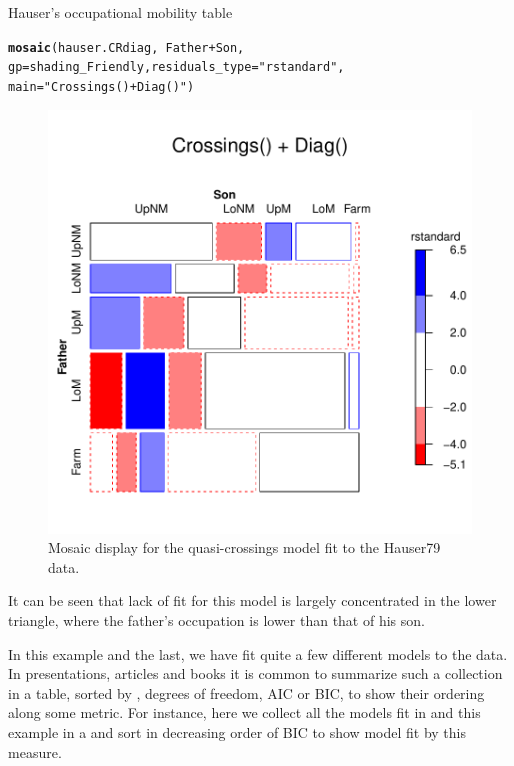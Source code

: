 \documentclass[11pt]{book}\usepackage[]{graphicx}\usepackage[]{color}
\makeatletter
\newcommand{\hlstr}[1]{\textcolor[rgb]{0.192,0.494,0.8}{#1}}%
\newcommand{\hlopt}[1]{\textcolor[rgb]{0,0,0}{#1}}%
\newcommand{\hlstd}[1]{\textcolor[rgb]{0.345,0.345,0.345}{#1}}%
\newcommand{\hlkwc}[1]{\textcolor[rgb]{0.333,0.667,0.333}{#1}}%
\newcommand{\hlkwd}[1]{\textcolor[rgb]{0.737,0.353,0.396}{\textbf{#1}}}%
\newenvironment{kframe}{%
 \def\at@end@of@kframe{}%
 \ifinner\ifhmode%
  \def\at@end@of@kframe{\end{minipage}}%
  \begin{minipage}{\columnwidth}%
 \fi\fi%
 \def\FrameCommand##1{\hskip\@totalleftmargin \hskip-\fboxsep
 \colorbox{shadecolor}{##1}\hskip-\fboxsep
     \hskip-\linewidth \hskip-\@totalleftmargin \hskip\columnwidth}%
 \MakeFramed {\advance\hsize-\width
   \@totalleftmargin\z@ \linewidth\hsize
   \@setminipage}}%
 {\par\unskip\endMakeFramed%
 \at@end@of@kframe}
\newenvironment{knitrout}{}{} %
\renewenvironment{knitrout}{\small\renewcommand{\baselinestretch}{.85}}{} %
\makeatother
\begin{document}
\begin{Example}[hauser2]{Hauser's occupational mobility table}
\begin{knitrout}
\color{fgcolor}\begin{kframe}
\begin{alltt}
\hlkwd{mosaic}\hlstd{(hauser.CRdiag,} \hlopt{~}\hlstd{Father}\hlopt{+}\hlstd{Son,}
       \hlkwc{gp}\hlstd{=shading_Friendly,} \hlkwc{residuals_type}\hlstd{=}\hlstr{"rstandard"}\hlstd{,}
       \hlkwc{main}\hlstd{=}\hlstr{"Crossings() + Diag()"}\hlstd{)}
\end{alltt}
\end{kframe}\begin{figure}[!htbp]


\centerline{\includegraphics[width=.6\textwidth]{ch08/fig/hauser-mosaic3-1} }

\caption[Mosaic display  for the quasi-crossings model fit to the Hauser79 data]{Mosaic display  for the quasi-crossings model fit to the Hauser79 data.\label{fig:hauser-mosaic3}}
\end{figure}


\end{knitrout}
\noindent It can be seen that lack of fit for this model is largely concentrated in
the lower triangle, where the father's occupation is lower than that of his son.

In this example and the last, we have fit quite a few different models to the
\citet{Hauser:79} data.  In presentations, articles and books it is common to
summarize such a collection in a table, sorted by \GSQ, degrees of freedom,
AIC or BIC, to show their ordering along some metric.
For instance, here we collect all the models fit in  and this
example in a  and sort in decreasing order of BIC
to show model fit by this measure. 


\end{Example}
\end{document}
